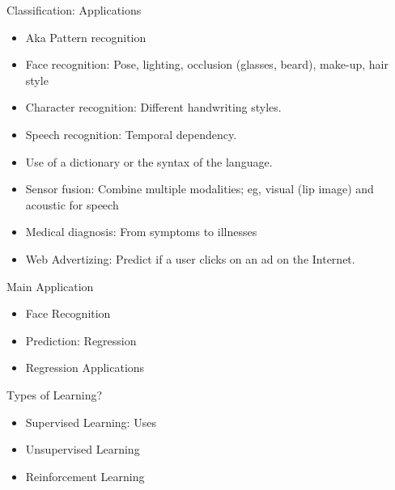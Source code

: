 \documentclass[8pt]{beamer}
\begin{document}
\begin{frame}{Classification: Applications}
    \begin{itemize}
        \item Aka Pattern recognition
\item Face recognition: Pose, lighting, occlusion (glasses, beard), make-up, hair style
\item Character recognition: Different handwriting styles.
\item Speech recognition: Temporal dependency.
\item Use of a dictionary or the syntax of the language.
\item Sensor fusion: Combine multiple modalities; eg, visual (lip image) and acoustic for speech
\item Medical diagnosis: From symptoms to illnesses
\item Web Advertizing: Predict if a user clicks on an ad on the Internet.
\end{itemize}
\end{frame}

\begin{frame}{Main Application}
    \begin{itemize}
        \item Face Recognition
        \item Prediction: Regression
        \item Regression Applications
    \end{itemize}
\end{frame}

%

\begin{frame}{Types of Learning?}
\begin{itemize}
    \item Supervised Learning: Uses
    \item Unsupervised Learning
    \item Reinforcement Learning
\end{itemize}
\end{frame}
\end{document}
